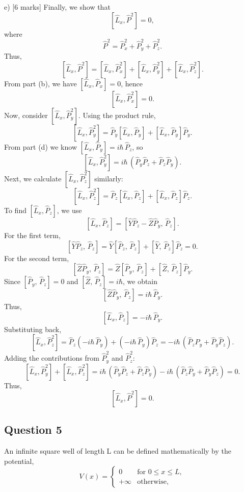 \documentclass{article}
\begin{document}
e) [6 marks]
Finally, we show that
\[
\left[\hat{L}_x, \hat{P}^2\right] = 0,
\]
where
\[
\hat{P}^2 = \hat{P}_x^2 + \hat{P}_y^2 + \hat{P}_z^2.
\]
Thus,
\[
\left[\hat{L}_x, \hat{P}^2\right] = \left[\hat{L}_x, \hat{P}_x^2\right] + \left[\hat{L}_x, \hat{P}_y^2\right] + \left[\hat{L}_x, \hat{P}_z^2\right].
\]
From part (b), we have \(\left[\hat{L}_x, \hat{P}_x\right]=0\), hence
\[
\left[\hat{L}_x, \hat{P}_x^2\right] = 0.
\]
Now, consider \(\left[\hat{L}_x, \hat{P}_y^2\right]\). Using the product rule,
\[
\left[\hat{L}_x, \hat{P}_y^2\right] = \hat{P}_y\left[\hat{L}_x, \hat{P}_y\right] + \left[\hat{L}_x, \hat{P}_y\right]\hat{P}_y.
\]
From part (d) we know \(\left[\hat{L}_x, \hat{P}_y\right] = i\hbar\,\hat{P}_z\), so
\[
\left[\hat{L}_x, \hat{P}_y^2\right] = i\hbar\,\left(\hat{P}_y\hat{P}_z + \hat{P}_z\hat{P}_y\right).
\]
Next, we calculate \(\left[\hat{L}_x, \hat{P}_z^2\right]\) similarly:
\[
\left[\hat{L}_x, \hat{P}_z^2\right] = \hat{P}_z\left[\hat{L}_x, \hat{P}_z\right] + \left[\hat{L}_x, \hat{P}_z\right]\hat{P}_z.
\]
To find \(\left[\hat{L}_x, \hat{P}_z\right]\), we use
\[
\left[\hat{L}_x, \hat{P}_z\right] = \left[\hat{Y}\hat{P}_z - \hat{Z}\hat{P}_y,\, \hat{P}_z\right].
\]
For the first term,
\[
\left[\hat{Y}\hat{P}_z,\, \hat{P}_z\right] = \hat{Y}\left[\hat{P}_z,\, \hat{P}_z\right] + \left[\hat{Y},\, \hat{P}_z\right]\hat{P}_z = 0.
\]
For the second term,
\[
\left[\hat{Z}\hat{P}_y,\, \hat{P}_z\right] = \hat{Z}\left[\hat{P}_y,\, \hat{P}_z\right] + \left[\hat{Z},\, \hat{P}_z\right]\hat{P}_y.
\]
Since \([\hat{P}_y,\, \hat{P}_z]=0\) and \([\hat{Z},\, \hat{P}_z] = i\hbar\), we obtain
\[
\left[\hat{Z}\hat{P}_y,\, \hat{P}_z\right] = i\hbar\,\hat{P}_y.
\]
Thus,
\[
\left[\hat{L}_x, \hat{P}_z\right] = -i\hbar\,\hat{P}_y.
\]
Substituting back,
\[
\left[\hat{L}_x, \hat{P}_z^2\right] = \hat{P}_z(-i\hbar\,\hat{P}_y) + (-i\hbar\,\hat{P}_y)\hat{P}_z = -i\hbar\,\left(\hat{P}_z\hat{P}_y + \hat{P}_y\hat{P}_z\right).
\]
Adding the contributions from \(\hat{P}_y^2\) and \(\hat{P}_z^2\):
\[
\left[\hat{L}_x, \hat{P}_y^2\right] + \left[\hat{L}_x, \hat{P}_z^2\right] = i\hbar\,\left(\hat{P}_y\hat{P}_z+\hat{P}_z\hat{P}_y\right) - i\hbar\,\left(\hat{P}_z\hat{P}_y+\hat{P}_y\hat{P}_z\right) = 0.
\]
Thus,
\[
\left[\hat{L}_x, \hat{P}^2\right] = 0.
\]



 \subsection{Question 5}
An infinite square well of length L can be defined mathematically by the potential,
\[
V(x) = 
\begin{cases} 
0 & \text{for } 0 \leq x \leq L, \\
+\infty & \text{otherwise},
\end{cases}
\]
\end{document}
